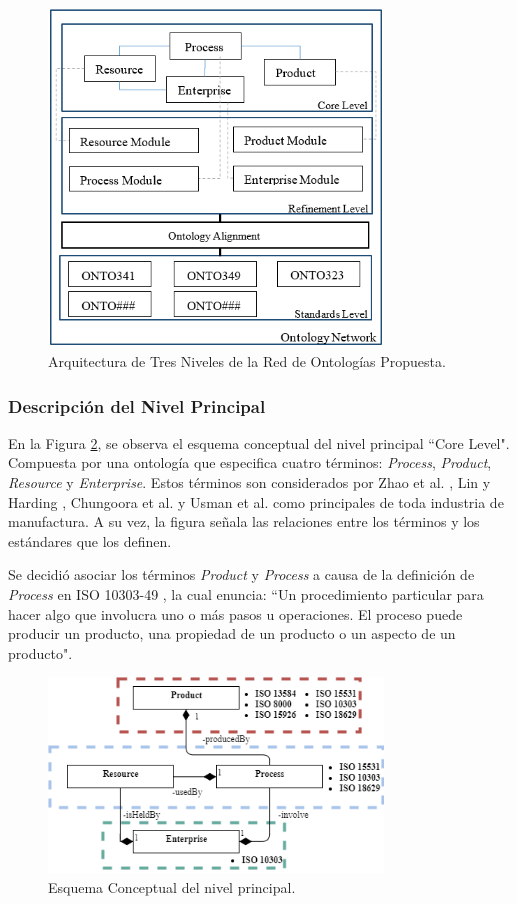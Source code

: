 \documentclass[journal]{IEEEtran}
\begin{document}
\begin{figure}[!t]
\centering
\includegraphics[width=3.5in]{figures/figure2.png}
\caption{Arquitectura de Tres Niveles de la Red de Ontolog\'ias Propuesta.}
\label{fig2}
\end{figure}



\subsubsection{Descripci\'on del Nivel Principal}

En la Figura \ref{fig3}, se observa el esquema conceptual del nivel principal ``Core Level". Compuesta por una ontolog\'ia que especifica cuatro t\'erminos: \emph{Process}, \emph{Product}, \emph{Resource} y \emph{Enterprise}. Estos t\'erminos son considerados por Zhao et al. \cite{Zhao1999}, Lin y Harding \cite{Lin2007},  Chungoora et al. \cite{Chungoora2013c} y Usman et al. \cite{Usman2013} como principales de toda industria de manufactura. A su vez, la figura señala las relaciones entre los t\'erminos y los est\'andares que los definen.

Se decidi\'o asociar los t\'erminos \emph{Product} y \emph{Process} a causa de la definici\'on de \emph{Process} en ISO 10303-49 \cite{ISOProperties}, la cual enuncia: ``Un procedimiento particular para hacer algo que involucra uno o m\'as pasos u operaciones. El proceso puede producir un producto, una propiedad de un producto o un aspecto de un producto". 

\begin{figure}[!t]
\centering
\includegraphics[width=3.5in]{figures/figure3.png}
\caption{Esquema Conceptual del nivel principal.}
\label{fig3}
\end{figure}
\end{document}
